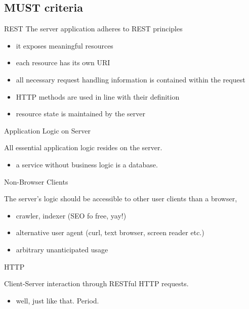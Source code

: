 \documentclass{beamer}
\begin{document}
\subsection{MUST criteria}

\begin{frame}{REST}
  The server application adheres to REST principles

  \begin{itemize}
    \item it exposes meaningful resources
    \item each resource has its own URI
    \item all necessary request handling information is contained within the request
    \item HTTP methods are used in line with their definition
    \item resource state is maintained by the server
  \end{itemize}
\end{frame}

\begin{frame}{Application Logic on Server}

  All essential application logic resides on the server.

  \begin{itemize}
    \item a service without business logic is a database.
  \end{itemize}
\end{frame}

\begin{frame}{Non-Browser Clients}

  The server's logic should be accessible to other user clients than a browser,

  \begin{itemize}
    \item crawler, indexer (SEO fo free, yay!)
    \item alternative user agent (curl, text browser, screen reader etc.)
    \item arbitrary unanticipated usage
  \end{itemize}
\end{frame}

\begin{frame}{HTTP}

  Client-Server interaction through RESTful HTTP requests.

  \begin{itemize}
    \item well, just like that. Period.
  \end{itemize}
\end{frame}
\end{document}
